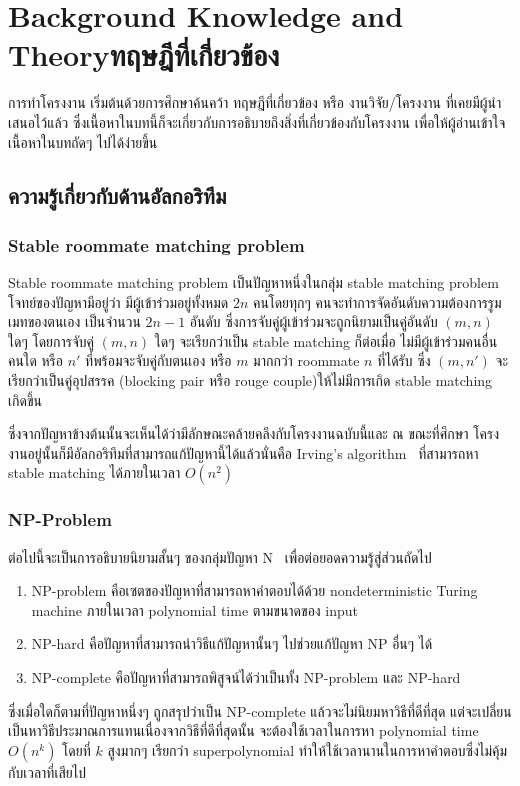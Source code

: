 \chapter{\ifenglish Background Knowledge and Theory\else ทฤษฎีที่เกี่ยวข้อง\fi}

การทำโครงงาน เริ่มต้นด้วยการศึกษาค้นคว้า ทฤษฎีที่เกี่ยวข้อง หรือ งานวิจัย/โครงงาน 
ที่เคยมีผู้นำเสนอไว้แล้ว ซึ่งเนื้อหาในบทนี้ก็จะเกี่ยวกับการอธิบายถึงสิ่งที่เกี่ยวข้องกับโครงงาน 
เพื่อให้ผู้อ่านเข้าใจเนื้อหาในบทถัดๆ ไปได้ง่ายขึ้น

\section{ความรู้เกี่ยวกับด้านอัลกอริทึม}
\subsection{Stable roommate matching problem}
Stable roommate matching problem เป็นปัญหาหนึ่งในกลุ่ม stable matching problem
โจทย์ของปัญหามีอยู่ว่า มีผู้เข้าร่วมอยู่ทั้งหมด $2n$ คนโดยทุกๆ คนจะทำการจัดอันดับความต้องการรูมเมทของตนเอง
เป็นจำนวน $2n-1$ อันดับ ซึ่งการจับคู่ผู้เข้าร่วมจะถูกนิยามเป็นคู่อันดับ $(m,n)$ ใดๆ โดยการจับคู่ $(m,n)$ ใดๆ จะเรียกว่าเป็น
stable matching ก็ต่อเมื่อ ไม่มีผู้เข้าร่วมคนอื่นคนใด หรือ $n'$ ที่พร้อมจะจับคู่กับตนเอง หรือ $m$ มากกว่า roommate $n$ ที่ได้รับ ซึ่ง $(m, n')$
จะเรียกว่าเป็นคู่อุปสรรค (blocking pair หรือ rouge couple)ให้ไม่มีการเกิด stable matching เกิดขึ้น

ซึ่งจากปัญหาข้างต้นนั้นจะเห็นได้ว่ามีลักษณะคล้ายคลึงกับโครงงานฉบับนี้และ ณ ขณะที่ศึกษา
โครงงานอยู่นั้นก็มีอัลกอริทึมที่สามารถแก้ปัญหานี้ได้แล้วนั่นคือ Irving's algorithm~\cite{irving1985efficient} ที่สามารถหา 
stable matching ได้ภายในเวลา $O(n^2)$

\subsection{NP-Problem}
ต่อไปนี้จะเป็นการอธิบายนิยามสั้นๆ ของกลุ่มปัญหา N~\cite{np} เพื่อต่อยอดความรู้สู่ส่วนถัดไป
\begin{enumerate}
  \item NP-problem คือเซตของปัญหาที่สามารถหาคำตอบได้ด้วย nondeterministic 
    Turing machine ภายในเวลา polynomial time ตามขนาดของ input
  \item  NP-hard คือปัญหาที่สามารถนำวิธีแก้ปัญหานั้นๆ ไปช่วยแก้ปัญหา NP อื่นๆ ได้
  \item  NP-complete คือปัญหาที่สามารถพิสูจน์ได้ว่าเป็นทั้ง NP-problem และ NP-hard
\end{enumerate}
ซึ่งเมื่อใดก็ตามที่ปัญหาหนึ่งๆ ถูกสรุปว่าเป็น NP-complete แล้วจะไม่นิยมหาวิธีที่ดีที่สุด
แต่จะเปลี่ยนเป็นหาวิธีประมาณการแทนเนื่องจากวิธีที่ดีที่สุดนั้น จะต้องใช้เวลาในการหา polynomial time $O(n^k)$
โดยที่ $k$ สูงมากๆ เรียกว่า superpolynomial ทำให้ใช้เวลานานในการหาคำตอบซึ่งไม่คุ้มกับเวลาที่เสียไป

